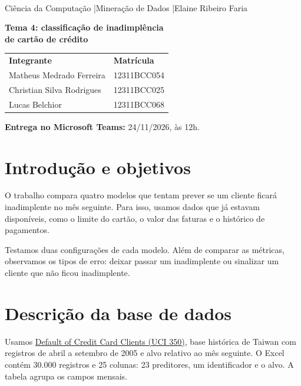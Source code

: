 \documentclass[11pt,a4paper]{article}
\begin{document}
\\
Ciência da Computação \enspace|\enspace Mineração de Dados \enspace|\enspace Elaine Ribeiro Faria

\vspace{6pt}
{\color{azulescuro}\par\Large\bfseries Tema 4: classificação de inadimplência\\ de cartão de crédito\par}
\smallskip
\begin{tabular}{@{}ll@{}}
\textbf{Integrante} & \textbf{Matrícula}\\
Matheus Medrado Ferreira & 12311BCC054\\
Christian Silva Rodrigues & 12311BCC025\\
Lucas Belchior & 12311BCC068\\
\end{tabular}
\par\smallskip
\textbf{Entrega no Microsoft Teams:} 24/11/2026, às 12h.

\section{Introdução e objetivos}
O trabalho compara quatro modelos que tentam prever se um cliente ficará
inadimplente no mês seguinte. Para isso, usamos dados que já estavam disponíveis,
como o limite do cartão, o valor das faturas e o histórico de pagamentos.

Testamos duas configurações de cada modelo. Além de comparar as métricas,
observamos os tipos de erro: deixar passar um inadimplente ou sinalizar
um cliente que não ficou inadimplente.

\section{Descrição da base de dados}
Usamos \href{https://archive.ics.uci.edu/dataset/350/default+of+credit+card+clients}{Default of Credit Card Clients (UCI 350)},
base histórica de Taiwan com registros de abril a setembro de 2005 e alvo
relativo ao mês seguinte. O Excel contém 30.000 registros e 25 colunas:
23 preditores, um identificador e o alvo. A tabela agrupa os campos mensais.
\end{document}
